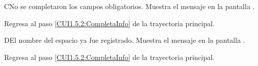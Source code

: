 \begin{UCtrayectoriaA}{C}{No se completaron los campos obligatorios.}
	\UCpaso [\UCsist] Muestra el mensaje  en la pantalla .
	
	\UCpaso Regresa al paso \ref{CUI1.5.2:CompletaInfo} de la trayectoria principal.
\end{UCtrayectoriaA}

\begin{UCtrayectoriaA}{D}{El nombre del espacio ya fue registrado.}
	\UCpaso [\UCsist] Muestra el mensaje  en la pantalla .
	
	\UCpaso Regresa al paso \ref{CUI1.5.2:CompletaInfo} de la trayectoria principal.
\end{UCtrayectoriaA}